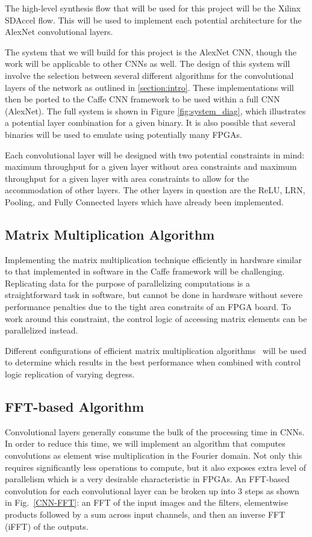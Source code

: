 \documentclass[conference,compsoc]{IEEEtran/IEEEtran}
\begin{document}
The high-level synthesis flow that will be used for this project will be the Xilinx
SDAccel flow. This will be used to implement each potential architecture for the
AlexNet convolutional layers.

The system that we will build for this project is the AlexNet CNN, though the work
will be applicable to other CNNs as well. The design of this system will involve the
selection between several different algorithms for the convolutional layers of the
network as outlined in \ref{section:intro}. These implementations will then be ported
to the Caffe CNN framework to be used within a full CNN (AlexNet). The full system
is shown in Figure \ref{fig:system_diag}, which illustrates a potential layer 
combination for a given binary. It is also possible that several binaries will be 
used to emulate using potentially many FPGAs. 

Each convolutional layer will be designed with two potential constraints in mind:
maximum throughput for a given layer without area constraints and maximum throughput
for a given layer with area constraints to allow for the accommodation of other
layers. The other layers in question are the ReLU, LRN, Pooling, and Fully Connected
layers which have already been implemented.

\subsection{Matrix Multiplication Algorithm}
Implementing the matrix multiplication technique efficiently in hardware similar to that implemented in software in the Caffe framework will be challenging.
Replicating data for the purpose of parallelizing computations is a straightforward task in software, but cannot be done in hardware without severe performance penalties due to the tight area constraits of an FPGA board.
To work around this constraint, the control logic of accessing matrix elements can be parallelized instead.

Different configurations of efficient matrix multiplication algorithms~\cite{MM_strassen,MM_efficient} will be used to determine which results in the best performance when combined with control logic replication of varying degress.

\subsection{FFT-based Algorithm}
Convolutional layers generally consume the bulk of the processing time in CNNs. In order to reduce this time, we will implement an algorithm that computes convolutions as element wise multiplication in the Fourier domain. Not only this requires significantly less operations to compute, but it also exposes extra level of parallelism which is a very desirable characteristic in FPGAs. An FFT-based convolution for each convolutional layer can be broken up into $3$ steps as shown in Fig.~\ref{CNN-FFT}: an FFT of the input images and the filters, elementwise products followed by a sum across input channels, and then an inverse FFT (iFFT) of the outputs.
\end{document}
